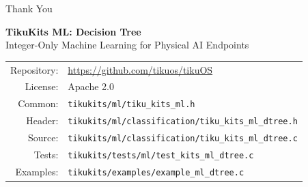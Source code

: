 \documentclass[aspectratio=169, 10pt]{beamer}
\begin{document}
\begin{frame}{Thank You}
\begin{center}
\Large\textbf{TikuKits ML: Decision Tree}\\[0.5em]
\normalsize Integer-Only Machine Learning for Physical AI Endpoints\\[1.5em]

\begin{tabular}{rl}
  Repository: & \url{https://github.com/tikuos/tikuOS} \\
  License:    & Apache 2.0 \\
  Common:     & \texttt{tikukits/ml/tiku\_kits\_ml.h} \\
  Header:     & \texttt{tikukits/ml/classification/tiku\_kits\_ml\_dtree.h} \\
  Source:     & \texttt{tikukits/ml/classification/tiku\_kits\_ml\_dtree.c} \\
  Tests:      & \texttt{tikukits/tests/ml/test\_kits\_ml\_dtree.c} \\
  Examples:   & \texttt{tikukits/examples/example\_ml\_dtree.c} \\
\end{tabular}
\end{center}
\end{frame}
\end{document}
